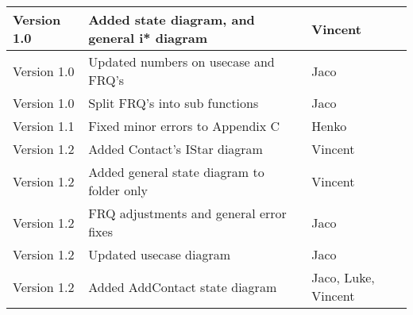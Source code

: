 \begin{center}
\begin{tabular}{|l|l|l|}
\hline
Version 1.0 & Added state diagram, and general i* diagram & Vincent\\
\hline
Version 1.0 & Updated numbers on usecase and FRQ's & Jaco\\
\hline
Version 1.0 & Split FRQ's into sub functions& Jaco\\
\hline
Version 1.1 & Fixed minor errors to Appendix C& Henko\\
\hline
Version 1.2 & Added Contact's IStar diagram & Vincent\\
\hline
Version 1.2 & Added general state diagram to folder only & Vincent\\
\hline
Version 1.2 & FRQ adjustments and general error fixes & Jaco\\
\hline
Version 1.2 & Updated usecase diagram& Jaco\\
\hline
Version 1.2 &Added AddContact state diagram &Jaco, Luke, Vincent\\
\hline

\end{tabular}

\begin{tabular}{|l|l|l|}


\end{tabular}
\end{center}
